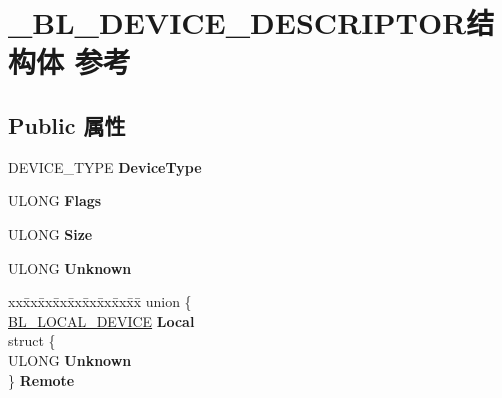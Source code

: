 \hypertarget{struct___b_l___d_e_v_i_c_e___d_e_s_c_r_i_p_t_o_r}{}\section{\+\_\+\+B\+L\+\_\+\+D\+E\+V\+I\+C\+E\+\_\+\+D\+E\+S\+C\+R\+I\+P\+T\+O\+R结构体 参考}
\label{struct___b_l___d_e_v_i_c_e___d_e_s_c_r_i_p_t_o_r}
\subsection*{Public 属性}
\begin{DoxyCompactItemize}
\item 
\mbox{\label{struct___b_l___d_e_v_i_c_e___d_e_s_c_r_i_p_t_o_r_a67f2887f7c88a8e27757add9d869c39d}} 
D\+E\+V\+I\+C\+E\+\_\+\+T\+Y\+PE {\bfseries Device\+Type}
\item 
\mbox{\label{struct___b_l___d_e_v_i_c_e___d_e_s_c_r_i_p_t_o_r_a49dc3686d68226ba0a52379e11f68cb4}} 
U\+L\+O\+NG {\bfseries Flags}
\item 
\mbox{\label{struct___b_l___d_e_v_i_c_e___d_e_s_c_r_i_p_t_o_r_a18d143f4fcf0435c069210a7c5c349d8}} 
U\+L\+O\+NG {\bfseries Size}
\item 
\mbox{\label{struct___b_l___d_e_v_i_c_e___d_e_s_c_r_i_p_t_o_r_ac1d9cff0ed4da6920ddf0903decd11a4}} 
U\+L\+O\+NG {\bfseries Unknown}
\item 
\mbox{\label{struct___b_l___d_e_v_i_c_e___d_e_s_c_r_i_p_t_o_r_abbf68b434bcffa971d8c729cb01bad52}} 
\begin{tabbing}
xx\=xx\=xx\=xx\=xx\=xx\=xx\=xx\=xx\=\kill
union \{\\
\>\hyperlink{struct___b_l___l_o_c_a_l___d_e_v_i_c_e}{BL\_LOCAL\_DEVICE} {\bfseries Local}\\
\>struct \{\\
\>\>ULONG {\bfseries Unknown}\\
\>\} {\bfseries Remote}\\

\end{tabbing}
\end{DoxyCompactItemize}
